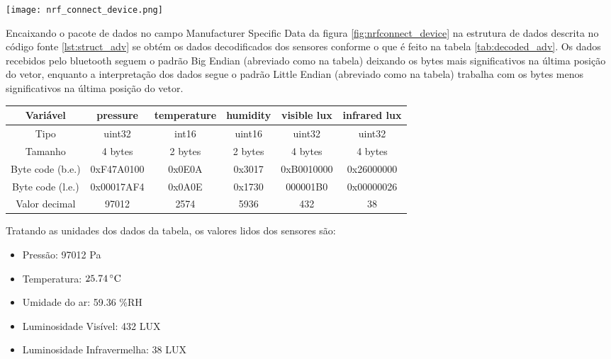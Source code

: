 \begin{center}
	\centering 
	\texttt{[image: nrf\_connect\_device.png]}
	\label{fig:nrfconnect_device}
\end{center} 

Encaixando o pacote de dados no campo Manufacturer Specific Data da figura
\ref{fig:nrfconnect_device} na estrutura de dados descrita no código fonte
\ref{lst:struct_adv} se obtém os dados decodificados dos sensores conforme o
que é feito na tabela \ref{tab:decoded_adv}. Os dados recebidos pelo bluetooth
seguem o padrão Big Endian (abreviado como  na tabela) deixando
os bytes mais significativos na última posição do vetor, enquanto a
interpretação dos dados segue o padrão Little Endian (abreviado como
 na tabela) trabalha com os bytes menos significativos na última
posição do vetor.

\begin{centering}
\vfill
\footnotesize
\begin{tabular}{| c | c | c | c | c | c |}

\hline 
\textbf{Variável} & \textbf{pressure} & \textbf{temperature} & \textbf{humidity} & \textbf{visible lux} & \textbf{infrared lux} \\ \hline 
Tipo & uint32 & int16 & uint16 & uint32 & uint32 \\ \hline
Tamanho & 4 bytes & 2 bytes & 2 bytes & 4 bytes & 4 bytes \\ \hline
Byte code (b.e.)& 0xF47A0100 & 0x0E0A & 0x3017 & 0xB0010000 & 0x26000000 \\ \hline
Byte code (l.e.)& 0x00017AF4 & 0x0A0E & 0x1730 & 000001B0 & 0x00000026 \\ \hline
Valor decimal & 97012 &  2574 & 5936 & 432 & 38 \\ \hline
\end{tabular}
\label{tab:decoded_adv}
\end{centering}

Tratando as unidades dos dados da tabela, os valores lidos dos sensores são:
\begin{itemize}
  \item Pressão: 97012 Pa
  \item Temperatura: $25.74\,^{\circ}{\rm C}$
  \item Umidade do ar: 59.36 \%RH
  \item Luminosidade Visível: 432 LUX
  \item Luminosidade Infravermelha: 38 LUX
\end{itemize}

